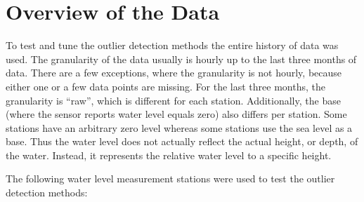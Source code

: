 \section{Overview of the Data}
To test and tune the outlier detection methods the entire history of data was used. The granularity of the data usually is hourly up to the last three months of data. There are a few exceptions, where the granularity is not hourly, because either one or a few data points are missing. For the last three months, the granularity is ``raw'', which is different for each station. Additionally, the base (where the sensor reports water level equals zero) also differs per station. Some stations have an arbitrary zero level whereas some stations use the sea level as a base. Thus the water level does not actually reflect the actual height, or depth, of the water. Instead, it represents the relative water level to a specific height.
\par
The following water level measurement stations were used to test the outlier detection methods:
